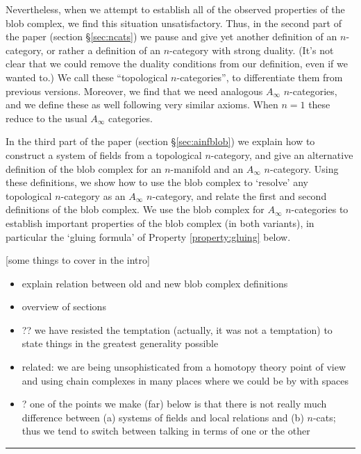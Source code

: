 Nevertheless, when we attempt to establish all of the observed properties of the blob complex, we find this situation unsatisfactory. Thus, in the second part of the paper (section \S \ref{sec:ncats}) we pause and give yet another definition of an $n$-category, or rather a definition of an $n$-category with strong duality. (It's not clear that we could remove the duality conditions from our definition, even if we wanted to.) We call these ``topological $n$-categories'', to differentiate them from previous versions. Moreover, we find that we need analogous $A_\infty$ $n$-categories, and we define these as well following very similar axioms. When $n=1$ these reduce to the usual $A_\infty$ categories.

In the third part of the paper (section \S \ref{sec:ainfblob}) we explain how to construct a system of fields from a topological $n$-category, and give an alternative definition of the blob complex for an $n$-manifold and an $A_\infty$ $n$-category. Using these definitions, we show how to use the blob complex to `resolve' any topological $n$-category as an $A_\infty$ $n$-category, and relate the first and second definitions of the blob complex. We use the blob complex for $A_\infty$ $n$-categories to establish important properties of the blob complex (in both variants), in particular the `gluing formula' of Property \ref{property:gluing} below.


[some things to cover in the intro]
\begin{itemize}
\item explain relation between old and new blob complex definitions
\item overview of sections
\item ?? we have resisted the temptation 
(actually, it was not a temptation) to state things in the greatest
generality possible
\item related: we are being unsophisticated from a homotopy theory point of
view and using chain complexes in many places where we could be by with spaces
\item ? one of the points we make (far) below is that there is not really much
difference between (a) systems of fields and local relations and (b) $n$-cats;
thus we tend to switch between talking in terms of one or the other
\end{itemize}

\medskip\hrule\medskip

